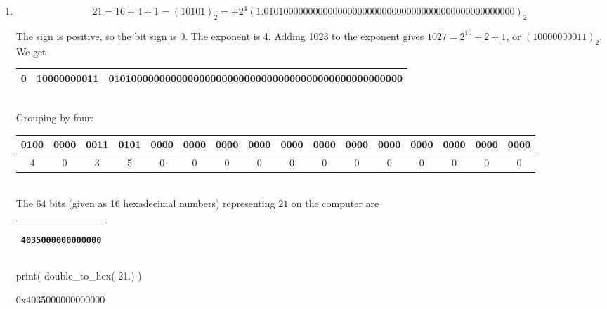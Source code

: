 \documentclass[pdftex,11pt]{article}
\begin{document}
\begin{enumerate}
\begin{comment}
\underline{Matlab Check}:
\begin{verbatim}

>> format hex; 8, format

ans =

   4020000000000000

\end{verbatim}
\end{comment}


\item 
$$ 21 = 16+4+1 = (10101)_2 = + 2^4 (1.010100000000000000000000000000000000000000000000000)_2 $$

The sign is positive, so the bit sign is $0$.
The exponent is 4. Adding 1023 to the exponent gives $1027 = 2^{10} + 2 + 1$, or $(10000000011)_2.$
We get\\

\begin{tabular}{|c|c|c|}
\hline
0 & 10000000011 & 0101000000000000000000000000000000000000000000000000 \\
\hline
\end{tabular}\\

Grouping by four:\\

\begin{tabular}{|c|c|c|c|c|c|c|c|c|c|c|c|c|c|c|c|}
\hline
0100&0000&0011&0101&0000&0000&0000&0000&0000&0000&0000&0000&0000&0000&0000&0000 \\
\hline
4&0&3&5&0&0&0&0&0&0&0&0&0&0&0&0\\
\hline
\end{tabular}\\

The 64 bits  (given as 16 hexadecimal numbers) representing $21$ on the computer are
\begin{center}
\begin{tabular}{|c|}
\hline
\begin{minipage}{0.17\textwidth}
\begin{verbatim}
4035000000000000
\end{verbatim}
\end{minipage}\\
\hline
\end{tabular}
\end{center}



\begin{python}
print( double_to_hex( 21.) )
\end{python}
\begin{pythonoutput}
0x4035000000000000
\end{pythonoutput}





\end{enumerate}
\end{document}
